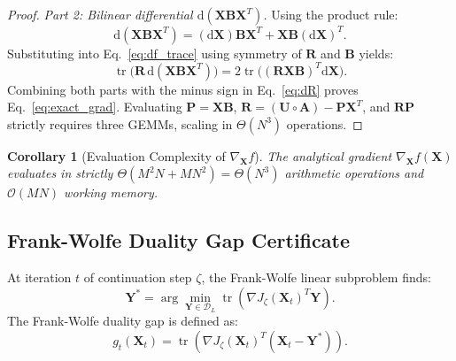 \documentclass[a4paper,fleqn]{cas-dc}
\theoremstyle{thmstyleone}
\newtheorem{corollary}[theorem]{Corollary}
\theoremstyle{thmstyletwo}
\theoremstyle{thmstylethree}
\begin{document}
\begin{proof}
\textit{Part 2: Bilinear differential $\mathrm{d}(\mathbf{X}\mathbf{B}\mathbf{X}^T)$.} Using the product rule:
\begin{equation}
\mathrm{d}(\mathbf{X}\mathbf{B}\mathbf{X}^T) = (\mathrm{d}\mathbf{X})\mathbf{B}\mathbf{X}^T + \mathbf{X}\mathbf{B}(\mathrm{d}\mathbf{X})^T.
\end{equation}
Substituting into Eq.~\eqref{eq:df_trace} using symmetry of $\mathbf{R}$ and $\mathbf{B}$ yields:
\begin{equation}
\operatorname{tr}\big(\mathbf{R} \, \mathrm{d}(\mathbf{X}\mathbf{B}\mathbf{X}^T)\big) = 2\operatorname{tr}\big((\mathbf{R}\mathbf{X}\mathbf{B})^T \mathrm{d}\mathbf{X}\big).
\end{equation}
Combining both parts with the minus sign in Eq.~\eqref{eq:dR} proves Eq.~\eqref{eq:exact_grad}. Evaluating $\mathbf{P} = \mathbf{X}\mathbf{B}$, $\mathbf{R} = (\mathbf{U} \circ \mathbf{A}) - \mathbf{P}\mathbf{X}^T$, and $\mathbf{R}\mathbf{P}$ strictly requires three GEMMs, scaling in $\Theta(N^3)$ operations.
\end{proof}

\begin{corollary}[Evaluation Complexity of $\nabla_{\mathbf{X}} f$]
\label{cor:gradient_complexity}
The analytical gradient $\nabla_{\mathbf{X}} f(\mathbf{X})$ evaluates in strictly $\Theta(M^2N + MN^2) = \Theta(N^3)$ arithmetic operations and $\mathcal{O}(MN)$ working memory.
\end{corollary}

\subsection{Frank-Wolfe Duality Gap Certificate}
At iteration $t$ of continuation step $\zeta$, the Frank-Wolfe linear subproblem finds:
\begin{equation}
\mathbf{Y}^* = \arg\min_{\mathbf{Y} \in \mathcal{D}_L} \operatorname{tr}\left( \nabla J_\zeta(\mathbf{X}_t)^T \mathbf{Y} \right).
\label{eq:fw_subproblem}
\end{equation}
The Frank-Wolfe duality gap is defined as:
\begin{equation}
g_t(\mathbf{X}_t) = \operatorname{tr}\left( \nabla J_\zeta(\mathbf{X}_t)^T (\mathbf{X}_t - \mathbf{Y}^*) \right).
\label{eq:duality_gap}
\end{equation}
\end{document}
